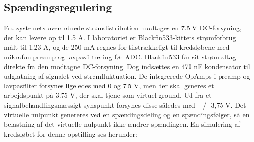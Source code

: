
\subsection*{Spændingsregulering}
Fra systemets overordnede strømdistribution modtages en 7.5 V DC-forsyning, der kan levere op til 1.5 A. I laboratoriet er Blackfin533-kittets strømforbrug målt til 1.23 A, og de 250 mA regnes for tilstrækkeligt til kredsløbene med mikrofon preamp og lavpasfiltrering før ADC.
Blackfin533 får sit strømudtag direkte fra den modtagne DC-forsyning. Dog indsættes en 470 nF kondensator til udglatning af signalet ved strømfluktuation. De integrerede OpAmps i preamp og lavpasfilter forsynes ligeledes med 0 og 7.5 V, men der skal generes et arbejdspunkt på 3.75 V, der skal tjene som virtuel ground. Ud fra et signalbehandlingsmæssigt synspunkt forsynes disse således med +/- 3,75 V.
Det virtuelle nulpunkt genereres ved en spændingsdeling og en spændingsfølger, så en belastning af det virtuelle nulpunkt ikke ændrer spændingen. En simulering af kredsløbet for denne opstilling ses herunder:  



